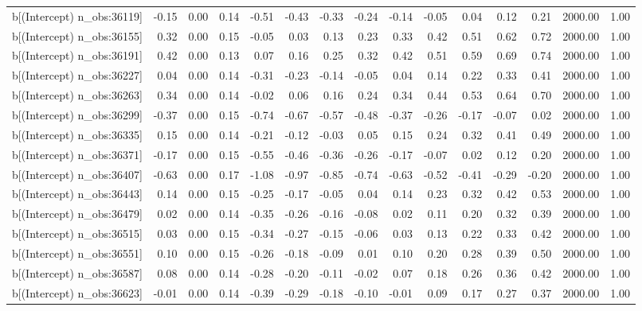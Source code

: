 \begin{table}[ht]
\begin{tabular}{rrrrrrrrrrrrrrr}
  b[(Intercept) n\_obs:36119] & -0.15 & 0.00 & 0.14 & -0.51 & -0.43 & -0.33 & -0.24 & -0.14 & -0.05 & 0.04 & 0.12 & 0.21 & 2000.00 & 1.00 \\ 
  b[(Intercept) n\_obs:36155] & 0.32 & 0.00 & 0.15 & -0.05 & 0.03 & 0.13 & 0.23 & 0.33 & 0.42 & 0.51 & 0.62 & 0.72 & 2000.00 & 1.00 \\ 
  b[(Intercept) n\_obs:36191] & 0.42 & 0.00 & 0.13 & 0.07 & 0.16 & 0.25 & 0.32 & 0.42 & 0.51 & 0.59 & 0.69 & 0.74 & 2000.00 & 1.00 \\ 
  b[(Intercept) n\_obs:36227] & 0.04 & 0.00 & 0.14 & -0.31 & -0.23 & -0.14 & -0.05 & 0.04 & 0.14 & 0.22 & 0.33 & 0.41 & 2000.00 & 1.00 \\ 
  b[(Intercept) n\_obs:36263] & 0.34 & 0.00 & 0.14 & -0.02 & 0.06 & 0.16 & 0.24 & 0.34 & 0.44 & 0.53 & 0.64 & 0.70 & 2000.00 & 1.00 \\ 
  b[(Intercept) n\_obs:36299] & -0.37 & 0.00 & 0.15 & -0.74 & -0.67 & -0.57 & -0.48 & -0.37 & -0.26 & -0.17 & -0.07 & 0.02 & 2000.00 & 1.00 \\ 
  b[(Intercept) n\_obs:36335] & 0.15 & 0.00 & 0.14 & -0.21 & -0.12 & -0.03 & 0.05 & 0.15 & 0.24 & 0.32 & 0.41 & 0.49 & 2000.00 & 1.00 \\ 
  b[(Intercept) n\_obs:36371] & -0.17 & 0.00 & 0.15 & -0.55 & -0.46 & -0.36 & -0.26 & -0.17 & -0.07 & 0.02 & 0.12 & 0.20 & 2000.00 & 1.00 \\ 
  b[(Intercept) n\_obs:36407] & -0.63 & 0.00 & 0.17 & -1.08 & -0.97 & -0.85 & -0.74 & -0.63 & -0.52 & -0.41 & -0.29 & -0.20 & 2000.00 & 1.00 \\ 
  b[(Intercept) n\_obs:36443] & 0.14 & 0.00 & 0.15 & -0.25 & -0.17 & -0.05 & 0.04 & 0.14 & 0.23 & 0.32 & 0.42 & 0.53 & 2000.00 & 1.00 \\ 
  b[(Intercept) n\_obs:36479] & 0.02 & 0.00 & 0.14 & -0.35 & -0.26 & -0.16 & -0.08 & 0.02 & 0.11 & 0.20 & 0.32 & 0.39 & 2000.00 & 1.00 \\ 
  b[(Intercept) n\_obs:36515] & 0.03 & 0.00 & 0.15 & -0.34 & -0.27 & -0.15 & -0.06 & 0.03 & 0.13 & 0.22 & 0.33 & 0.42 & 2000.00 & 1.00 \\ 
  b[(Intercept) n\_obs:36551] & 0.10 & 0.00 & 0.15 & -0.26 & -0.18 & -0.09 & 0.01 & 0.10 & 0.20 & 0.28 & 0.39 & 0.50 & 2000.00 & 1.00 \\ 
  b[(Intercept) n\_obs:36587] & 0.08 & 0.00 & 0.14 & -0.28 & -0.20 & -0.11 & -0.02 & 0.07 & 0.18 & 0.26 & 0.36 & 0.42 & 2000.00 & 1.00 \\ 
  b[(Intercept) n\_obs:36623] & -0.01 & 0.00 & 0.14 & -0.39 & -0.29 & -0.18 & -0.10 & -0.01 & 0.09 & 0.17 & 0.27 & 0.37 & 2000.00 & 1.00 \\ 

\end{tabular}
\end{table}
